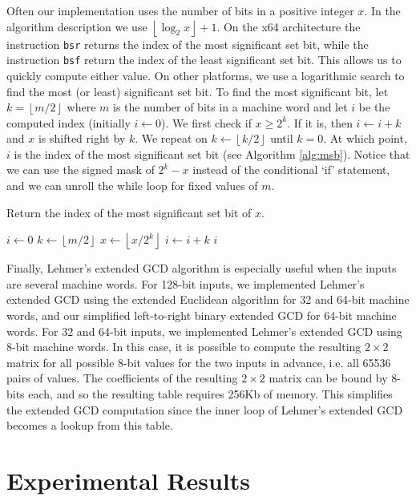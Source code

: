 \documentclass{ucalgthes1}
\theoremstyle{definition}
\newcommand{\floor}[1]{\left\lfloor #1 \right\rfloor}
\begin{document}
Often our implementation uses the number of bits in a positive integer $x$.  In the algorithm description we use $\floor{\log_2x} + 1$.  On the x64 architecture the instruction \texttt{bsr} returns the index of the most significant set bit, while the instruction \texttt{bsf} return the index of the least significant set bit.  This allows us to quickly compute either value.  On other platforms, we use a logarithmic search to find the most (or least) significant set bit.  To find the most significant bit, let $k = \floor{m/2}$ where $m$ is the number of bits in a machine word and let $i$ be the computed index (initially $i \gets 0$).  We first check if $x \ge 2^k$.  If it is, then $i \gets i + k$ and $x$ is shifted right by $k$.  We repeat on $k \gets \floor{k/2}$ until $k=0$.  At which point, $i$ is the index of the most significant set bit (see Algorithm \ref{alg:msb}).  Notice that we can use the signed mask of $2^k - x$ instead of the conditional `if' statement, and we can unroll the while loop for fixed values of $m$.

\begin{algorithm}[htb]
\caption{Return the index of the most significant set bit of $x$.}
\label{alg:msb}
\begin{algorithmic}[1]
\State $i \gets 0$
\State $k \gets \floor{m/2}$ 
		\State $x \gets \floor{x / 2^k}$
		\State $i \gets i + k$
	\EndIf
\EndWhile
\State \Return $i$
\end{algorithmic}
\end{algorithm}

Finally, Lehmer's extended GCD algorithm is especially useful when the inputs are several machine words.  For 128-bit inputs, we implemented Lehmer's extended GCD using the extended Euclidean algorithm for 32 and 64-bit machine words, and our simplified left-to-right binary extended GCD for 64-bit machine words.  For 32 and 64-bit inputs, we implemented Lehmer's extended GCD using 8-bit machine words.  In this case, it is possible to compute the resulting $2 \times 2$ matrix for all possible 8-bit values for the two inputs in advance, i.e. all 65536 pairs of values.  The coefficients of the resulting $2 \times 2$ matrix can be bound by 8-bits each, and so the resulting table requires 256Kb of memory. This simplifies the extended GCD computation since the inner loop of Lehmer's extended GCD becomes a lookup from this table.

\section{Experimental Results}
\label{sec:gcdResults}
\end{document}
